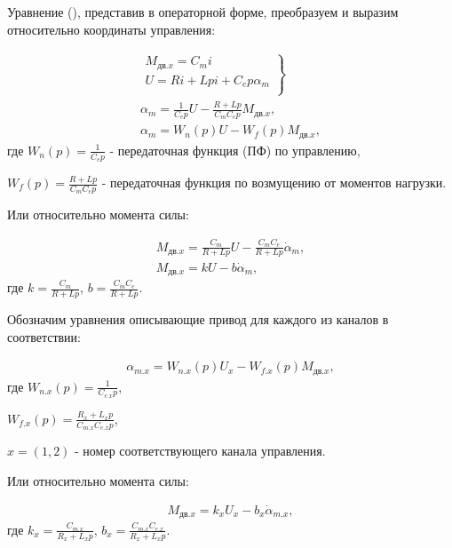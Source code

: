 {Уравнение (), представив в операторной форме, преобразуем и выразим относительно координаты управления:

\begin{equation}
\label{eq:p3:lin2}
\begin{multlined}
\left.
\begin{matrix}
M_{\textit{дв.x}} = C_m i\\
U = R i + L p i + C_e p \alpha_m \\
\end{matrix}
\right\rbrace \\
\alpha_m = \frac{1}{C_e p} U - \frac{R + L p}{C_m C_e p} M_{\textit{дв.x}},\\
\alpha_m = W_n(p) U - W_f(p) M_{\textit{дв.x}},
\end{multlined}
\end{equation}
где
$W_n(p) = \frac{1}{C_e p}$ - передаточная функция (ПФ) по управлению,

$W_f(p) = \frac{R + L p}{C_m C_e p}$ - передаточная функция по возмущению от моментов нагрузки.

Или относительно момента силы:

\begin{equation}
\label{eq:p3:lin2+}
\begin{multlined}
M_{\textit{дв.x}} = \frac{C_m}{R + L p} U - \frac{C_m C_e}{R + L p} \dot\alpha_m,\\
M_{\textit{дв.x}} = k U - b \dot\alpha_m,
\end{multlined}
\end{equation}
где
$k = \frac{C_m}{R + L p}$,
$b = \frac{C_m C_e}{R + L p}$.

Обозначим уравнения описывающие привод для каждого из каналов в соответствии:

\begin{equation}
\label{eq:p3:lin3}
\begin{multlined}
\alpha_{m.x} = W_{n.x}(p) U_x - W_{f.x}(p) M_{\textit{дв.x}},
\end{multlined}
\end{equation}
где 
$W_{n.x}(p) = \frac{1}{C_{e.x} p}$,

$W_{f.x}(p) = \frac{R_x + L_x p}{C_{m.x} C_{e.x} p}$,

$x = (1,2)$ - номер соответствующего канала управления.

Или относительно момента силы:

\begin{equation}
\label{eq:p3:lin4}
\begin{multlined}
M_{\textit{дв.x}} = k_x U_x - b_x \dot\alpha_{m.x},
\end{multlined}
\end{equation}
где
$k_x = \frac{C_{m.x}}{R_x + L_x p}$,
$b_x = \frac{C_{m.x} C_{e.x}}{R_x + L_x p}$.

}
